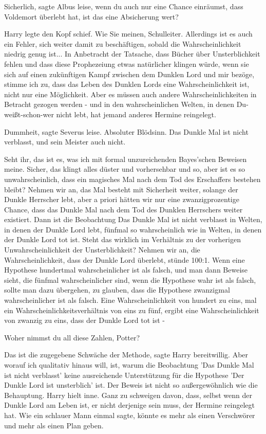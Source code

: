 \glqq Sicherlich\grqq{}, sagte Albus leise, \glqq wenn du auch nur eine Chance
einräumst, dass Voldemort überlebt hat, ist das eine Absicherung wert?\grqq{}

Harry legte den Kopf schief. \glqq Wie Sie meinen, Schulleiter. Allerdings ist
es auch ein Fehler, sich weiter damit zu beschäftigen, sobald die
Wahrscheinlichkeit niedrig genug ist... In Anbetracht der Tatsache, dass Bücher
über Unsterblichkeit fehlen und dass diese Prophezeiung etwas natürlicher
klingen würde, wenn sie sich auf einen zukünftigen Kampf zwischen dem Dunklen
Lord und mir bezöge, stimme ich zu, dass das Leben des Dunklen Lords eine
Wahrscheinlichkeit ist, nicht nur eine Möglichkeit. Aber es müssen auch andere
Wahrscheinlichkeiten in Betracht gezogen werden - und in den wahrscheinlichen
Welten, in denen Du-weißt-schon-wer nicht lebt, hat jemand anderes Hermine
reingelegt.\grqq{}

\glqq Dummheit\grqq{}, sagte Severus leise. \glqq Absoluter Blödsinn. Das Dunkle
Mal ist nicht verblasst, und sein Meister auch nicht.\grqq{}

\glqq Seht ihr, das ist es, was ich mit formal unzureichenden Bayes'schen
Beweisen meine. Sicher, das klingt alles düster und vorhersehbar und so, aber
ist es so unwahrscheinlich, dass ein magisches Mal nach dem Tod des Erschaffers
bestehen bleibt? Nehmen wir an, das Mal besteht mit Sicherheit weiter, solange
der Dunkle Herrscher lebt, aber a priori hätten wir nur eine zwanzigprozentige
Chance, dass das Dunkle Mal nach dem Tod des Dunklen Herrschers weiter
existiert. Dann ist die Beobachtung \glqq Das Dunkle Mal ist nicht
verblasst\grqq{} in Welten, in denen der Dunkle Lord lebt, fünfmal so
wahrscheinlich wie in Welten, in denen der Dunkle Lord tot ist. Steht das
wirklich im Verhältnis zu der vorherigen Unwahrscheinlichkeit der
Unsterblichkeit? Nehmen wir an, die Wahrscheinlichkeit, dass der Dunkle Lord
überlebt, stünde 100:1. Wenn eine Hypothese hundertmal wahrscheinlicher ist als
falsch, und man dann Beweise sieht, die fünfmal wahrscheinlicher sind, wenn die
Hypothese wahr ist als falsch, sollte man dazu übergehen, zu glauben, dass die
Hypothese zwanzigmal wahrscheinlicher ist als falsch. Eine Wahrscheinlichkeit
von hundert zu eins, mal ein Wahrscheinlichkeitsverhältnis von eins zu fünf,
ergibt eine Wahrscheinlichkeit von zwanzig zu eins, dass der Dunkle Lord tot ist
-\grqq{}

\glqq Woher nimmst du all diese Zahlen, Potter?\grqq{}

\glqq Das ist die zugegebene Schwäche der Methode\grqq{}, sagte Harry
bereitwillig. \glqq Aber worauf ich qualitativ hinaus will, ist, warum die
Beobachtung 'Das Dunkle Mal ist nicht verblasst' keine ausreichende
Unterstützung für die Hypothese 'Der Dunkle Lord ist unsterblich' ist. Der
Beweis ist nicht so außergewöhnlich wie die Behauptung.\grqq{} Harry hielt inne.
\glqq Ganz zu schweigen davon, dass, selbst wenn der Dunkle Lord am Leben ist,
er nicht derjenige sein muss, der Hermine reingelegt hat. Wie ein schlauer Mann
einmal sagte, könnte es mehr als einen Verschwörer und mehr als einen Plan
geben.\grqq{}

